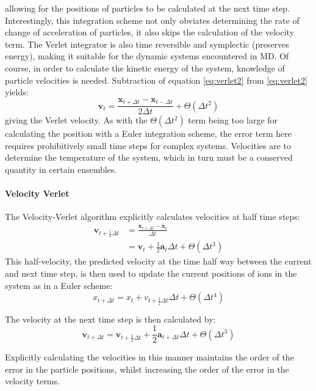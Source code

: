 \noindent allowing for the positions of particles to be calculated at the next time step.
Interestingly, this integration scheme not only obviates determining the rate of change of acceleration of particles, it also skips the calculation of the velocity term.
The Verlet integrator is also time reversible and symplectic (preserves energy), making it suitable for the dynamic systems encountered in MD.
Of course, in order to calculate the kinetic energy of the system, knowledge of particle velocities is needed.
Subtraction of equation \ref{eq:verlet2} from \ref{eq:verlet2} yields:
\begin{equation}
	\mathbf{v}_{t} = \frac{\mathbf{x}_{t+\Delta t} - \mathbf{x}_{t-\Delta t}}{2\Delta t} + \Theta(\Delta t^2)
\end{equation}
giving the Verlet velocity.
As with the $\Theta(\Delta t^2)$ term being too large for calculating the position with a Euler integration scheme, the error term here requires prohibitively small time steps for complex systems.
Velocities are to determine the temperature of the system, which in turn must be a conserved quantity in certain ensembles. %

\paragraph{Velocity Verlet} The Velocity-Verlet algorithm explicitly calculates velocities at half time steps:
\begin{align}
	\mathbf{v}_{t +\frac{1}{2}\Delta t} &= \frac{\mathbf{x}_{t+\Delta t} - \mathbf{x}_t}{\Delta t}\\[10pt]
	&= \mathbf{v}_t + \frac{1}{2}\mathbf{a}_t\Delta t + \Theta(\Delta t^3)
\end{align}
This half-velocity, the predicted velocity at the time half way between the current and next time step, is then used to update the current positions of ions in the system as in a Euler scheme:
\begin{equation}
	x_{t+\Delta t} = x_t + v_{t +\frac{1}{2}\Delta t}\Delta t + \Theta(\Delta t^4)
\end{equation}

\noindent The velocity at the next time step is then calculated by:
\begin{equation}
	\mathbf{v}_{t + \Delta t} = \mathbf{v}_{t +\frac{1}{2}\Delta t} + \frac{1}{2}\mathbf{a}_{t+\Delta t}\Delta t + \Theta(\Delta t^3)
\end{equation}

\noindent Explicitly calculating the velocities in this manner maintains the order of the error in the particle positions, whilst increasing the order of the error in the velocity terms.

